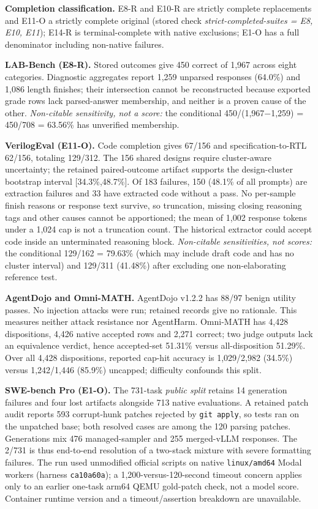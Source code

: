 \documentclass[a4paper,runningheads]{llncs}
\begin{document}
\textbf{Completion classification.} E8-R and E10-R are strictly complete
replacements and E11-O a strictly complete original (stored check
\emph{strict-completed-suites = E8, E10, E11}); E14-R is terminal-complete with
native exclusions; E1-O has a full denominator including non-native failures.

\textbf{LAB-Bench (E8-R).} Stored outcomes give 450 correct of 1,967 across
eight categories. Diagnostic aggregates report 1,259 unparsed responses
(64.0\%) and 1,086 length finishes; their intersection cannot be reconstructed
because exported grade rows lack parsed-answer membership, and neither is a
proven cause of the other. \emph{Non-citable sensitivity, not a score:} the
conditional 450/(1,967$-$1,259) = 450/708 = 63.56\% has unverified membership.

\textbf{VerilogEval (E11-O).} Code completion gives 67/156 and
specification-to-RTL 62/156, totaling 129/312. The 156 shared designs require
cluster-aware uncertainty; the retained paired-outcome artifact supports the
design-cluster bootstrap interval [34.3\%,48.7\%]. Of 183 failures, 150 (48.1\%
of all prompts) are extraction failures and 33 have extracted code without a
pass. No per-sample finish reasons or response text survive, so truncation,
missing closing reasoning tags and other causes cannot be apportioned; the
mean of 1,002 response tokens under a 1,024 cap is not a truncation count. The
historical extractor could accept code inside an unterminated reasoning block.
\emph{Non-citable sensitivities, not scores:} the conditional 129/162 = 79.63\%
(which may include draft code and has no cluster interval) and 129/311
(41.48\%) after excluding one non-elaborating reference test.

\textbf{AgentDojo and Omni-MATH.} AgentDojo v1.2.2 has 88/97 benign utility
passes. No injection attacks were run; retained records give no rationale.
This measures neither attack resistance nor AgentHarm. Omni-MATH has 4,428 dispositions, 4,426 native accepted rows and
2,271 correct; two judge outputs lack an equivalence verdict, hence accepted-set
51.31\% versus all-disposition 51.29\%. Over all 4,428 dispositions, reported
cap-hit accuracy is 1,029/2,982 (34.5\%) versus 1,242/1,446 (85.9\%) uncapped;
difficulty confounds this split.

\textbf{SWE-bench Pro (E1-O).} The 731-task \emph{public split} retains 14
generation failures and four lost artifacts alongside 713 native evaluations.
A retained patch audit reports 593 corrupt-hunk patches rejected by
\texttt{git apply}, so tests ran on the unpatched base; both resolved cases are
among the 120 parsing patches. Generations mix 476 managed-sampler and 255
merged-vLLM responses. The 2/731 is thus end-to-end resolution of a two-stack
mixture with severe formatting failures. The run used unmodified official
scripts on native \texttt{linux/amd64} Modal workers (harness
\texttt{ca10a60a}); a 1,200-versus-120-second timeout concern applies only to an
earlier one-task arm64 QEMU gold-patch check, not a model score. Container
runtime version and a timeout/assertion breakdown are unavailable.
\end{document}
